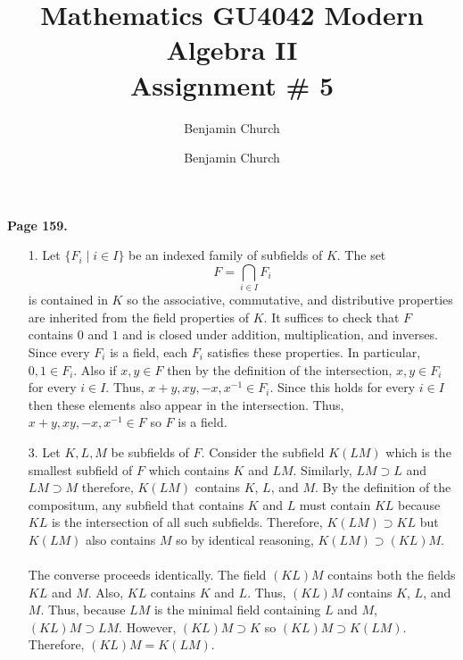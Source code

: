\documentclass[12pt]{extarticle}
\author{Benjamin Church }
\newcommand{\atitle}[1]{\title{%
	\large \textbf{Mathematics GU4042 Modern Algebra II
	\\ Assignment \# #1} \vspace{-2ex}}
\author{Benjamin Church }
\maketitle}
\begin{document}
\atitle{5}
\textbf{Page 159.} 
\begin{enumerate}
\item[1.] Let $\{F_i \mid i \in I \}$ be an indexed family of subfields of $K$. The set 
\[ F = \bigcap_{i \in I} F_i\] is contained in $K$ so the associative, commutative,  and distributive properties are inherited from the field properties of $K$. It suffices to check that $F$ contains $0$ and $1$ and is closed under addition, multiplication, and inverses. Since every $F_i$ is a field, each $F_i$ satisfies these properties. In particular, $0, 1 \in F_i$. Also if $x, y \in F$ then by the definition of the intersection, $x, y \in F_i$ for every $i \in I$. Thus, $x + y, xy , -x , x^{-1} \in F_i$. Since this holds for every $i \in I$ then these elements also appear in the intersection. Thus, $x + y, xy, -x, x^{-1} \in F$ so $F$ is a field. 

\item[3.] Let $K, L, M$ be subfields of $F$. Consider the subfield $K(LM)$ which is the smallest subfield of $F$ which contains $K$ and $LM$. Similarly, $LM \supset L$ and $LM \supset M$ therefore, $K(LM)$ contains $K$, $L$, and $M$. By the definition of the compositum, any subfield that contains $K$ and $L$ must contain $KL$ because $KL$ is the intersection of all such subfields. Therefore, $K(LM) \supset KL$ but $K(LM)$ also contains $M$ so by identical reasoning, $K(LM) \supset (KL)M$. \\ \\ The converse proceeds identically. The field $(KL)M$ contains both the fields $KL$ and $M$. Also, $KL$ contains $K$ and $L$. Thus, $(KL)M$ contains $K$, $L$, and $M$. Thus, because $LM$ is the minimal field containing $L$ and $M$, $(KL)M \supset LM$. However, $(KL)M \supset K$ so $(KL)M \supset K(LM)$. Therefore, $(KL)M = K(LM)$.        
\end{enumerate}
\end{document}
